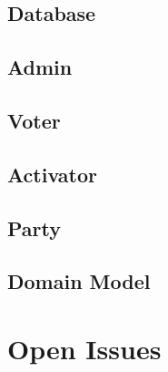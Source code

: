 \documentclass[11pt]{article}
\begin{document}
	\subsection{Database}
		
		
	\subsection{Admin}
		
		\newpage	
		
	\subsection{Voter}
		
		\newpage
		
	\subsection{Activator}
		
		\newpage
		
	\subsection{Party}
		
		
	\subsection{Domain Model}
		
		
	\section{Open Issues}
		
	
\end{document}

